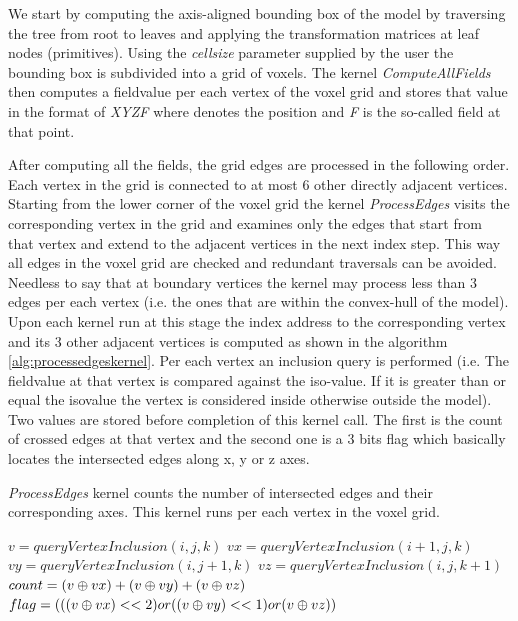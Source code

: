 We start by computing the axis-aligned bounding box of the model by traversing the tree from root to leaves 
and applying the transformation matrices at leaf nodes (primitives). Using the \textit{cellsize} parameter supplied by the user the 
bounding box is subdivided into a grid of voxels. The kernel \textit{ComputeAllFields} then computes a fieldvalue per each
vertex of the voxel grid and stores that value in the format of \textit{XYZF} where  denotes the position and 
\textit{F} is the so-called field at that point. 


After computing all the fields, the grid edges are processed in the following order. 
Each vertex in the grid is connected to at most 6 other directly adjacent vertices. Starting from the lower corner of the voxel grid 
the kernel \textit{ProcessEdges} visits the corresponding vertex in the grid and examines only the edges that start 
from that vertex and extend to the adjacent vertices in the next index step. This way all edges in the voxel grid are checked 
and redundant traversals can be avoided. Needless to say that at boundary vertices the kernel may process less than 3 edges per each 
vertex (i.e. the ones that are within the convex-hull of the model). Upon each kernel run at this stage the index address to 
the corresponding vertex and its 3 other adjacent vertices is computed as shown in the algorithm \ref{alg:processedgeskernel}. Per each vertex
an inclusion query is performed (i.e. The fieldvalue at that vertex is compared against the iso-value. If it is greater than or equal 
the isovalue the vertex is considered inside otherwise outside the model). Two values are stored before completion of this kernel call. 
The first is the count of crossed edges at that vertex and the second one is a 3 bits flag which basically locates the intersected 
edges along x, y or z axes.


\begin{algorithm}[H]
\caption{\textit{ProcessEdges} kernel counts the number of intersected edges and their corresponding axes. 
This kernel runs per each vertex in the voxel grid.}
\label{alg:processedgeskernel}
\begin{algorithmic}[1]	
  \STATE $v = queryVertexInclusion(i, j, k)$
  \STATE $vx = queryVertexInclusion(i+1, j, k)$
  \STATE $vy = queryVertexInclusion(i, j+1, k)$
  \STATE $vz = queryVertexInclusion(i, j, k+1)$
  \STATE $count = (v \mathbin{\oplus} vx) + (v \mathbin{\oplus} vy) + (v \mathbin{\oplus} vz)$
  \STATE $flag = (((v \mathbin{\oplus} vx) << 2) or ((v \mathbin{\oplus} vy) << 1) or (v \mathbin{\oplus} vz))$
\end{algorithmic}
\end{algorithm}


